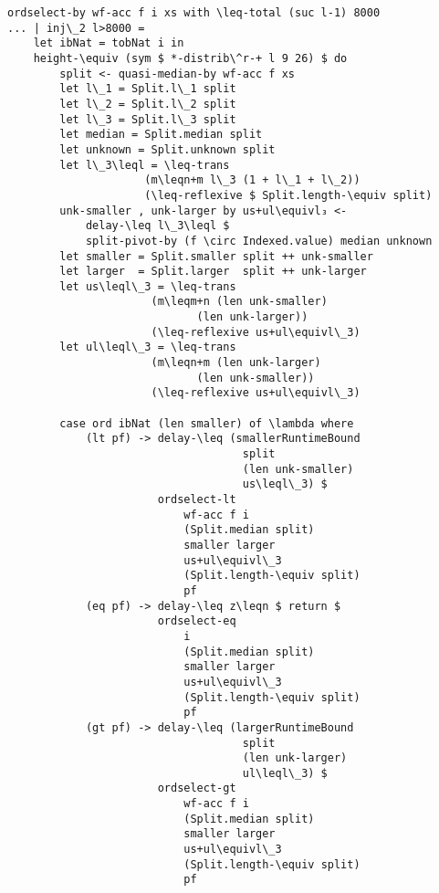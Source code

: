\begin{lstlisting}[caption={Quickselect ($l > 8000$)},label={lst:median:quickselect:large},emph={ordselect,by}]
ordselect-by wf-acc f i xs with \leq-total (suc l-1) 8000
... | inj\_2 l>8000 =
    let ibNat = tobNat i in
    height-\equiv (sym $ *-distrib\^r-+ l 9 26) $ do
        split <- quasi-median-by wf-acc f xs
        let l\_1 = Split.l\_1 split
        let l\_2 = Split.l\_2 split
        let l\_3 = Split.l\_3 split
        let median = Split.median split
        let unknown = Split.unknown split
        let l\_3\leql = \leq-trans
                     (m\leqn+m l\_3 (1 + l\_1 + l\_2))
                     (\leq-reflexive $ Split.length-\equiv split)
        unk-smaller , unk-larger by us+ul\equivl₃ <-
            delay-\leq l\_3\leql $
            split-pivot-by (f \circ Indexed.value) median unknown
        let smaller = Split.smaller split ++ unk-smaller
        let larger  = Split.larger  split ++ unk-larger
        let us\leql\_3 = \leq-trans
                      (m\leqm+n (len unk-smaller)
                             (len unk-larger))
                      (\leq-reflexive us+ul\equivl\_3)
        let ul\leql\_3 = \leq-trans
                      (m\leqn+m (len unk-larger)
                             (len unk-smaller))
                      (\leq-reflexive us+ul\equivl\_3)

        case ord ibNat (len smaller) of \lambda where
            (lt pf) -> delay-\leq (smallerRuntimeBound
                                    split
                                    (len unk-smaller)
                                    us\leql\_3) $
                       ordselect-lt
                           wf-acc f i
                           (Split.median split)
                           smaller larger
                           us+ul\equivl\_3
                           (Split.length-\equiv split)
                           pf
            (eq pf) -> delay-\leq z\leqn $ return $
                       ordselect-eq
                           i
                           (Split.median split)
                           smaller larger
                           us+ul\equivl\_3
                           (Split.length-\equiv split)
                           pf
            (gt pf) -> delay-\leq (largerRuntimeBound
                                    split
                                    (len unk-larger)
                                    ul\leql\_3) $
                       ordselect-gt
                           wf-acc f i
                           (Split.median split)
                           smaller larger
                           us+ul\equivl\_3
                           (Split.length-\equiv split)
                           pf
\end{lstlisting}

